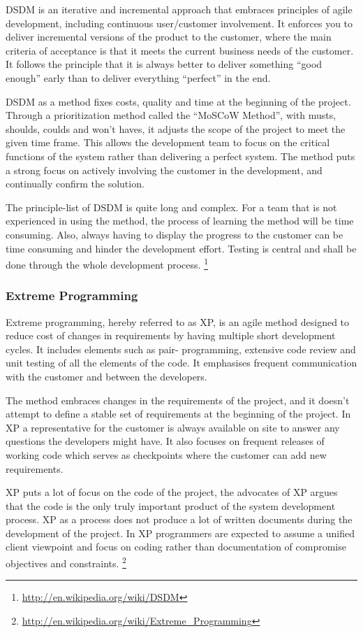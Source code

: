 DSDM is an iterative and incremental approach that embraces principles of agile development, including continuous user/customer involvement. It enforces you to deliver incremental versions of the product to the customer, where the main criteria of acceptance is that it meets the current business needs of the customer. It follows the principle that it is always better to deliver something “good enough” early than to deliver everything “perfect” in the end.

DSDM as a method fixes costs, quality and time at the beginning of the project. Through a prioritization method called the “MoSCoW Method”, with musts, shoulds, coulds and won’t haves, it adjusts the scope of the project to meet the given time frame. This allows the development team to focus on the critical functions of the system rather than delivering a perfect system. The method puts a strong focus on actively involving the customer in the development, and continually confirm the solution.

The principle-list of DSDM is quite long and complex. For a team that is not experienced in using the method, the process of learning the method will be time consuming. Also, always having to display the progress to the customer can be time consuming and hinder the development effort. 
Testing is central and shall be done through the whole development process.
\footnote{\url{http://en.wikipedia.org/wiki/DSDM}}

\subsubsection{Extreme Programming}
Extreme programming, hereby referred to as XP, is an agile method designed to reduce cost of changes in requirements by having multiple short development cycles. It includes elements such as pair- programming, extensive code review and unit testing of all the elements of the code. It emphasises frequent communication with the customer and between the developers.

The method embraces changes in the requirements of the project, and it doesn't attempt to define a stable set of requirements at the beginning of the project. In XP a representative for the customer is always available on site to answer any questions the developers might have. It also focuses on frequent releases of working code which serves as checkpoints where the customer can add new requirements.
 
XP puts a lot of focus on the code of the project, the advocates of XP argues that the code is the only truly important product of the system development process. XP as a process does not produce a lot of written documents during the development of the project. In XP programmers are expected to assume a unified client viewpoint and focus on coding rather than documentation of compromise objectives and constraints.
\footnote{\url{http://en.wikipedia.org/wiki/Extreme_Programming}}

